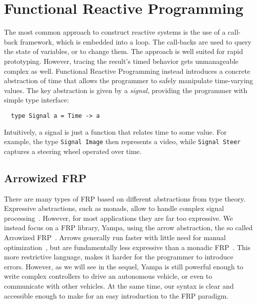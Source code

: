 \section{Functional Reactive Programming}

The most common approach to construct reactive systems is the use of a call-back framework, which is embedded into a loop.
The call-backs are used to query the state of variables, or to change them.
The approach is well suited for rapid prototyping. 
However, tracing the result's timed behavior gets unmanageable complex as well.
Functional Reactive Programming instead introduces a concrete abstraction of time that allows the programmer to safely manipulate time-varying values.
The key abstraction is given by a \textit{signal}, providing the programmer with simple type interface:

\vspace{0.2em}
\begin{lstlisting}
  type Signal a = Time -> a
\end{lstlisting}
\vspace{0.2em}

\noindent Intuitively, a signal is just a function that relates time to some value.
For example, the type \texttt{Signal Image} then represents a video, while \texttt{Signal Steer} captures a steering wheel operated over time.

\subsection{Arrowized FRP}

There are many types of FRP based on different abstractions from type theory.
Expressive abstractions, such as monads, allow to handle complex signal processing~\cite{van2014monadic}. However, for most applications they are far too expressive.
We instead focus on a FRP library, Yampa, using the arrow abstraction, the so called Arrowized FRP~\cite{hudak2003arrows}.
Arrows generally run faster with little need for manual optimization~\cite{yallop2016causal}, but are fundamentally less expressive than a monadic FRP~\cite{lindley2011idioms}.
This more restrictive language, makes it harder for the programmer to introduce errors.
However, as we will see in the sequel, Yampa is still powerful enough to write complex controllers to drive an autonomous vehicle, or even to communicate with other vehicles.
At the same time, our syntax is clear and accessible enough to make for an easy introduction to the FRP paradigm.

